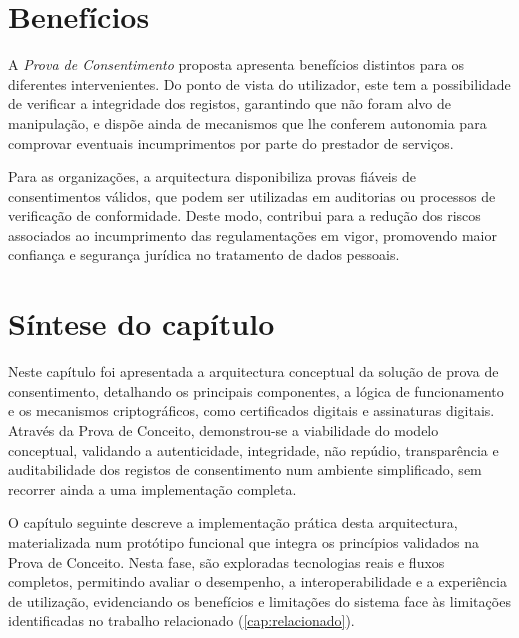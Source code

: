 \section{Benefícios}

A \textit{Prova de Consentimento} proposta apresenta benefícios distintos para os diferentes intervenientes.
Do ponto de vista do utilizador, este tem a possibilidade de verificar a integridade dos registos, garantindo que não foram alvo de manipulação, e dispõe ainda de mecanismos que lhe conferem autonomia para comprovar eventuais incumprimentos por parte do prestador de serviços.

Para as organizações, a arquitectura disponibiliza provas fiáveis de consentimentos válidos, que podem ser utilizadas em auditorias ou processos de verificação de conformidade.
Deste modo, contribui para a redução dos riscos associados ao incumprimento das regulamentações em vigor, promovendo maior confiança e segurança jurídica no tratamento de dados pessoais.

\section{Síntese do capítulo}

Neste capítulo foi apresentada a arquitectura conceptual da solução de prova de consentimento, detalhando os principais componentes, a lógica de funcionamento e os mecanismos criptográficos, como certificados digitais e assinaturas digitais. Através da Prova de Conceito, demonstrou-se a viabilidade do modelo conceptual, validando a autenticidade, integridade, não repúdio, transparência e auditabilidade dos registos de consentimento num ambiente simplificado, sem recorrer ainda a uma implementação completa.

O capítulo seguinte descreve a implementação prática desta arquitectura, materializada num protótipo funcional que integra os princípios validados na Prova de Conceito. Nesta fase, são exploradas tecnologias reais e fluxos completos, permitindo avaliar o desempenho, a interoperabilidade e a experiência de utilização, evidenciando os benefícios e limitações do sistema face às limitações identificadas no trabalho relacionado (\ref{cap:relacionado}).
